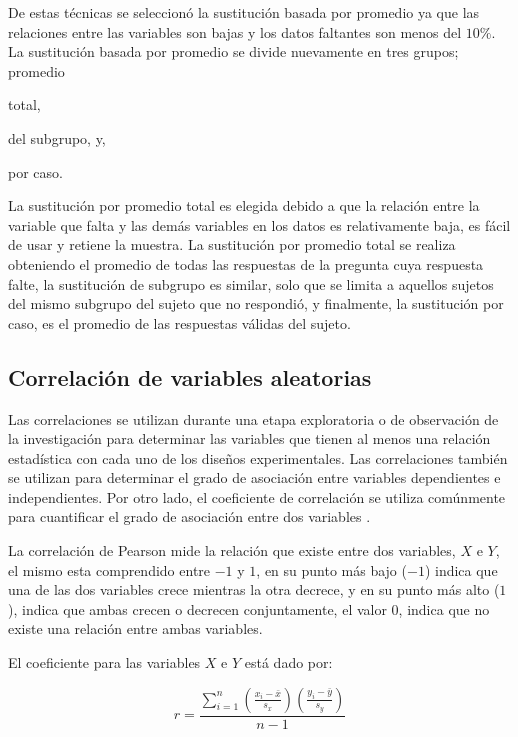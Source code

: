 De estas técnicas se seleccionó la sustitución basada por promedio ya que las
relaciones entre las variables son bajas y los datos faltantes son menos del
$10\%$. La sustitución basada por promedio se divide nuevamente en tres
grupos\cite{tsikriktsis2005review}; promedio
\begin{enumerate*}[label=\itshape\alph*\upshape.]
\item total,
\item del subgrupo, y,
\item por caso.
\end{enumerate*}

La sustitución por promedio total es elegida debido a que la relación entre la
variable que falta y las demás variables en los datos es relativamente baja, es
fácil de usar y retiene la muestra. La sustitución por promedio total se realiza
obteniendo el promedio de todas las respuestas de la pregunta cuya respuesta
falte, la sustitución de subgrupo es similar, solo que se limita a aquellos
sujetos del mismo subgrupo del sujeto que no respondió, y finalmente, la
sustitución por caso, es el promedio de las respuestas válidas del sujeto.

\subsection{Correlación de variables aleatorias}
\label{sec:correlacion}

Las correlaciones se utilizan durante una etapa exploratoria o de observación de
la investigación para determinar las variables que tienen al menos una relación
estadística con cada uno de los diseños experimentales. Las correlaciones
también se utilizan para determinar el grado de asociación entre variables
dependientes e independientes. Por otro lado, el coeficiente de correlación se
utiliza comúnmente para cuantificar el grado de asociación entre dos variables
\cite{BoslaughStatistics2008}.

La correlación de Pearson\cite{BoslaughStatistics2008} mide la relación que
existe entre dos variables, $X$ e $Y$, el mismo esta comprendido entre $-1$ y
$1$, en su punto más bajo ($-1$) indica que una de las dos variables crece mientras
la otra decrece, y en su punto más alto ($1$), indica que ambas crecen o
decrecen conjuntamente, el valor $0$, indica que no existe una relación entre
ambas variables.

El coeficiente para las variables $X$ e $Y$ está dado por:

\begin{equation}
r = \frac{\sum_{i=1}^n{(\frac{x_i-\bar{x}}{s_x})({\frac{y_i-\bar{y}}{s_y}})}}%
{n - 1}
\end{equation}

